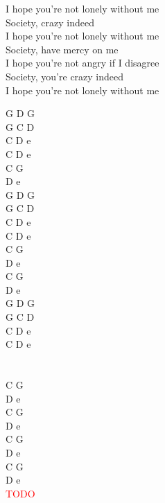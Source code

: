 \documentclass[a5paper, 10pt]{book}
\begin{document}
\begin{minipage}[t]{0.9\textwidth}
\hspace*{5mm}I hope you're not lonely without me\\
\hspace*{5mm}Society, crazy indeed\\
\hspace*{5mm}I hope you're not lonely without me\\
\hspace*{5mm}Society, have mercy on me\\
\hspace*{5mm}I hope you're not angry if I disagree\\
\hspace*{5mm}Society, you're crazy indeed\\
\hspace*{5mm}I hope you're not lonely without me\\
\end{minipage}
\begin{minipage}[t]{0.1\textwidth}
G D G\\
G C D\\
C D e\\
C D e\\

C G\\
D e\\

G D G\\
G C D\\
C D e\\
C D e\\

C G\\
D e\\
C G\\
D e\\

G D G\\
G C D\\
C D e\\
C D e\\
\\
\\
C G\\
D e\\
C G\\
D e\\
C G\\
D e\\
C G\\
D e\\

\textcolor{red}{TODO}\\
\end{minipage}
\end{document}

